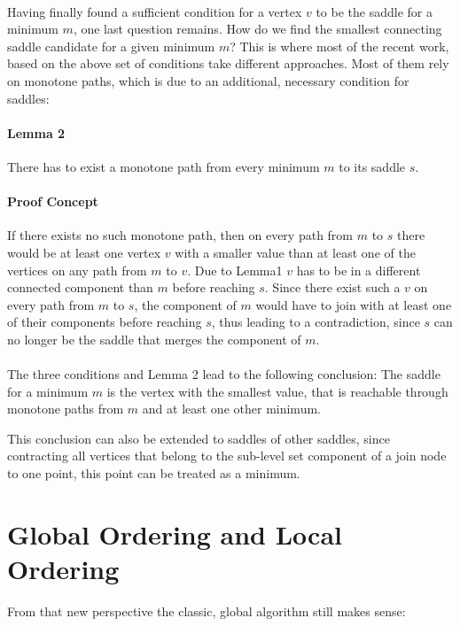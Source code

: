 \documentclass[%
	paper=A4,					%
	twoside=true,				%
	openright,					%
	parskip=full,				%
	chapterprefix=true,			%
	11pt,						%
	headings=normal,			%
	bibliography=totoc,			%
	listof=totoc,				%
	titlepage=on,				%
	captions=tableabove,		%
	draft=false,				%
]{scrreprt}%
\begin{document}
\paragraph{}
Having finally found a sufficient condition for a vertex \(v\) to be the saddle for a minimum \(m\), one last question remains. How do we find the smallest connecting saddle candidate for a given minimum \(m\)? This is where most of the recent work, based on the above set of conditions take different approaches. Most of them rely on monotone paths, which is due to an additional, necessary condition for saddles:

\paragraph{Lemma 2} There has to exist a monotone path from every minimum \(m\) to its saddle \(s\). 

\paragraph{Proof Concept}
If there exists no such monotone path, then on every path from \(m\) to \(s\) there would be at least one vertex \(v\) with a smaller value than at least one of the vertices on any path from \(m\) to \(v\). Due to Lemma1 \(v\) has to be in a different connected component than \(m\) before reaching \(s\). Since there exist such a \(v\) on every path from \(m\) to \(s\), the component of \(m\) would have to join with at least one of their components before reaching \(s\), thus leading to a contradiction, since \(s\) can no longer be the saddle that merges the component of \(m\).  

\paragraph{}
The three conditions and Lemma 2 lead to the following conclusion: The saddle for a minimum \(m\) is the vertex with the smallest value, that is reachable through monotone paths from \(m\) and at least one other minimum. 

This conclusion can also be extended to saddles of other saddles, since contracting all vertices that belong to the sub-level set component of a join node to one point, this point can be treated as a minimum.

\section{Global Ordering and Local Ordering}
From that new perspective the classic, global algorithm \cite{orig} still makes sense: 
\end{document}
